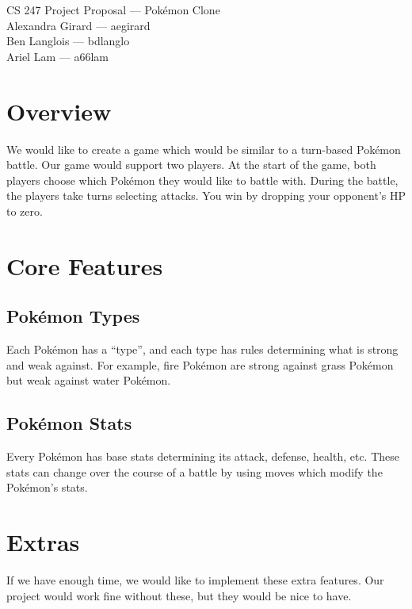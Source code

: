 \documentclass{article}
\begin{document}
\begin{center}
  {\LARGE CS 247 Project Proposal --- Pok\'emon Clone} \\
  \vspace{1em}
  {\large Alexandra Girard --- aegirard} \\
  {\large Ben Langlois --- bdlanglo} \\
  {\large Ariel Lam --- a66lam}
\end{center}

\section*{Overview}
We would like to create a game which would be similar to a turn-based Pok\'emon battle. Our game would support two players. At the start of the game, both players choose which Pok\'emon they would like to battle with. During the battle, the players take turns selecting attacks. You win by dropping your opponent's HP to zero.

\section*{Core Features}

\subsection*{Pok\'emon Types}
Each Pok\'emon has a ``type'', and each type has rules determining what is strong and weak against. For example, fire Pok\'emon are strong against grass Pok\'emon but weak against water Pok\'emon.

\subsection*{Pok\'emon Stats}
Every Pok\'emon has base stats determining its attack, defense, health, etc. These stats can change over the course of a battle by using moves which modify the Pok\'emon's stats.



\section*{Extras}
If we have enough time, we would like to implement these extra features. Our project would work fine without these, but they would be nice to have.
\end{document}
